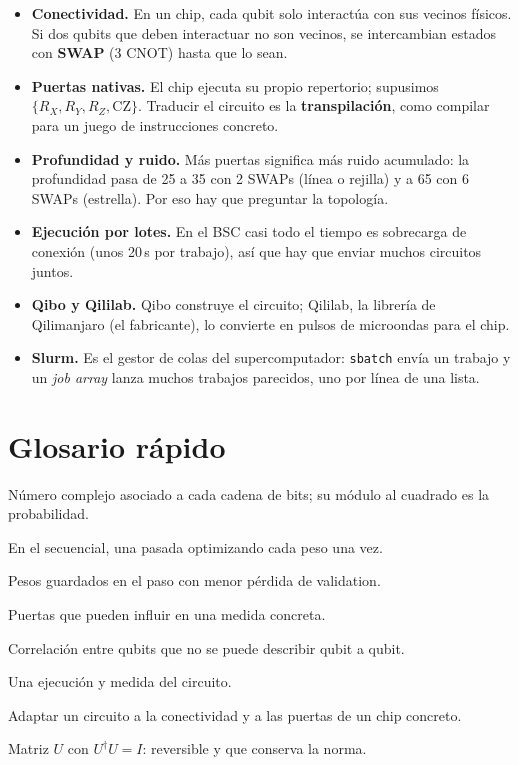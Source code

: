 \documentclass[11pt,a4paper]{article}
\begin{document}
\begin{itemize}
  \item \textbf{Conectividad.} En un chip, cada qubit solo interactúa con sus vecinos físicos. Si dos qubits que deben
        interactuar no son vecinos, se intercambian estados con \textbf{SWAP} (3 CNOT) hasta que lo sean.
  \item \textbf{Puertas nativas.} El chip ejecuta su propio repertorio; supusimos $\{R_X, R_Y, R_Z, \mathrm{CZ}\}$. Traducir
        el circuito es la \textbf{transpilación}, como compilar para un juego de instrucciones concreto.
  \item \textbf{Profundidad y ruido.} Más puertas significa más ruido acumulado: la profundidad pasa de 25 a 35 con
        2 SWAPs (línea o rejilla) y a 65 con 6 SWAPs (estrella). Por eso hay que preguntar la topología.
  \item \textbf{Ejecución por lotes.} En el BSC casi todo el tiempo es sobrecarga de conexión (unos 20\,s por
        trabajo), así que hay que enviar muchos circuitos juntos.
  \item \textbf{Qibo y Qililab.} Qibo construye el circuito; Qililab, la librería de Qilimanjaro (el fabricante), lo
        convierte en pulsos de microondas para el chip.
  \item \textbf{Slurm.} Es el gestor de colas del supercomputador: \texttt{sbatch} envía un trabajo y un
        \emph{job array} lanza muchos trabajos parecidos, uno por línea de una lista.
\end{itemize}

\section{Glosario rápido}

\begin{description}[style=sameline,leftmargin=3.4cm,font=\bfseries]
  \item[Amplitud] Número complejo asociado a cada cadena de bits; su módulo al cuadrado es la probabilidad.
  \item[Barrido] En el secuencial, una pasada optimizando cada peso una vez.
  \item[Checkpoint] Pesos guardados en el paso con menor pérdida de validation.
  \item[Cono de luz] Puertas que pueden influir en una medida concreta.
  \item[Entrelazamiento] Correlación entre qubits que no se puede describir qubit a qubit.
  \item[Shot] Una ejecución y medida del circuito.
  \item[Transpilar] Adaptar un circuito a la conectividad y a las puertas de un chip concreto.
  \item[Unitaria] Matriz $U$ con $U^\dagger U = I$: reversible y que conserva la norma.
\end{description}
\end{document}
